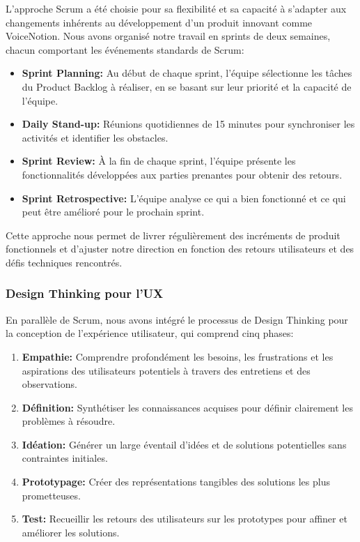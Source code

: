 L'approche Scrum a été choisie pour sa flexibilité et sa capacité à s'adapter aux changements inhérents au développement d'un produit innovant comme VoiceNotion. Nous avons organisé notre travail en sprints de deux semaines, chacun comportant les événements standards de Scrum:

\begin{itemize}
    \item \textbf{Sprint Planning:} Au début de chaque sprint, l'équipe sélectionne les tâches du Product Backlog à réaliser, en se basant sur leur priorité et la capacité de l'équipe.
    
    \item \textbf{Daily Stand-up:} Réunions quotidiennes de 15 minutes pour synchroniser les activités et identifier les obstacles.
    
    \item \textbf{Sprint Review:} À la fin de chaque sprint, l'équipe présente les fonctionnalités développées aux parties prenantes pour obtenir des retours.
    
    \item \textbf{Sprint Retrospective:} L'équipe analyse ce qui a bien fonctionné et ce qui peut être amélioré pour le prochain sprint.
\end{itemize}

Cette approche nous permet de livrer régulièrement des incréments de produit fonctionnels et d'ajuster notre direction en fonction des retours utilisateurs et des défis techniques rencontrés.

\subsubsection{Design Thinking pour l'UX}

En parallèle de Scrum, nous avons intégré le processus de Design Thinking pour la conception de l'expérience utilisateur, qui comprend cinq phases:

\begin{enumerate}
    \item \textbf{Empathie:} Comprendre profondément les besoins, les frustrations et les aspirations des utilisateurs potentiels à travers des entretiens et des observations.
    
    \item \textbf{Définition:} Synthétiser les connaissances acquises pour définir clairement les problèmes à résoudre.
    
    \item \textbf{Idéation:} Générer un large éventail d'idées et de solutions potentielles sans contraintes initiales.
    
    \item \textbf{Prototypage:} Créer des représentations tangibles des solutions les plus prometteuses.
    
    \item \textbf{Test:} Recueillir les retours des utilisateurs sur les prototypes pour affiner et améliorer les solutions.
\end{enumerate}

